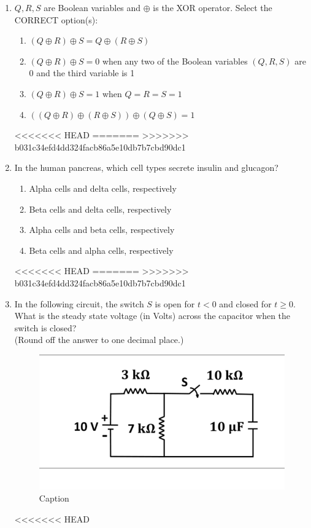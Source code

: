\documentclass[journal]{IEEEtran}
\begin{document}
\begin{enumerate}
\item  \( Q, R, S \) are Boolean variables and \( \oplus \) is the XOR operator. Select the CORRECT option(s):

\begin{enumerate}
    \item \( (Q \oplus R) \oplus S = Q \oplus (R \oplus S) \)
    \item \( (Q \oplus R) \oplus S = 0 \) when any two of the Boolean variables \( (Q, R, S) \) are 0 and the third variable is 1
    \item \( (Q \oplus R) \oplus S = 1 \) when \( Q = R = S = 1 \)
    \item \( ((Q \oplus R) \oplus (R \oplus S)) \oplus (Q \oplus S) = 1 \)
\end{enumerate}
<<<<<<< HEAD
\hfill{}
=======
\hfill{}
>>>>>>> b031c34efd4dd324facb86a5e10db7b7cbd90dc1

\item  In the human pancreas, which cell types secrete insulin and glucagon?

\begin{enumerate}
    \item Alpha cells and delta cells, respectively
    \item Beta cells and delta cells, respectively
    \item Alpha cells and beta cells, respectively
    \item Beta cells and alpha cells, respectively
\end{enumerate}
<<<<<<< HEAD
\hfill{}
=======
\hfill{}
>>>>>>> b031c34efd4dd324facb86a5e10db7b7cbd90dc1

\item  In the following circuit, the switch \( S \) is open for \( t < 0 \) and closed for \( t \geq 0 \). What is the steady state voltage (in Volts) across the capacitor when the switch is closed?\\
(Round off the answer to one decimal place.)
\begin{figure}[H]
    \centering
    \includegraphics[width=0.5\columnwidth]{Figs/q28.png}
    \caption{Caption}
    \label{fig:placeholder}
\end{figure}
<<<<<<< HEAD
\hfill{}


\end{enumerate}
\end{document}
